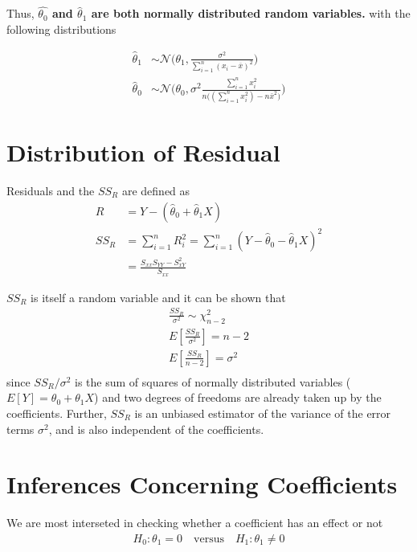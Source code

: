 \documentclass[../probability-notes.tex]{subfiles}
\begin{document}
    Thus, \textbf{$\hat{\theta_{0}}$ and $\hat{\theta}_{1}$ are both normally distributed random variables.} with the following distributions

    \begin{align*}
        \hat{\theta}_{1} &\sim \mathcal{N}\bigg(\theta_{1}, \frac{\sigma^{2}}{\sum_{i=1}^{n}(x_{i} - \overline{x})^{2}} \bigg)\\
        \hat{\theta}_{0} &\sim \mathcal{N}\bigg(\theta_{0}, \sigma^{2} \frac{\sum_{i=1}^{n} x_{i}^{2}}{n\big((\sum_{i=1}^{n} x_{i}^{2}) - n\bar{x}^{2} \big)} \bigg)
    \end{align*}


    \section{Distribution of Residual}
    Residuals and the $SS_{R}$ are defined as
    \begin{align*}
        R &= Y - (\hat{\theta}_{0} + \hat{\theta}_{1}X)\\
        SS_{R} &= \sum_{i=1}^{n} R_{i}^{2} = \sum_{i=1}^{n} (Y - \hat{\theta}_{0} - \hat{\theta}_{1}X)^{2}\\
        &= \frac{S_{xx}S_{YY} - S_{xY}^{2}}{S_{xx}}
    \end{align*}

    $SS_{R}$ is itself a random variable and it can be shown that
    \begin{align*}
        \frac{SS_{R}}{\sigma^{2}} \sim \chi_{n-2}^{2}\\
        E[\frac{SS_{R}}{\sigma^{2}}] = n - 2\\
        E[\frac{SS_{R}}{n-2}] = \sigma^{2}\\
    \end{align*}
    since $SS_{R}/\sigma^{2}$ is the sum of squares of normally distributed variables ($E[Y] = \theta_{0} + \theta_{1}X$) and two degrees of freedoms are already taken up by the coefficients. Further, $SS_{R}$ is an unbiased estimator of the variance of the error terms $\sigma^{2}$, and is also independent of the coefficients.

    \section{Inferences Concerning Coefficients}
    We are most interseted in checking whether a coefficient has an effect or not
    \begin{align*}
        H_{0}: \theta_{1} = 0 \quad \text{versus} \quad H_{1}: \theta_{1} \neq 0
    \end{align*}
\end{document}
